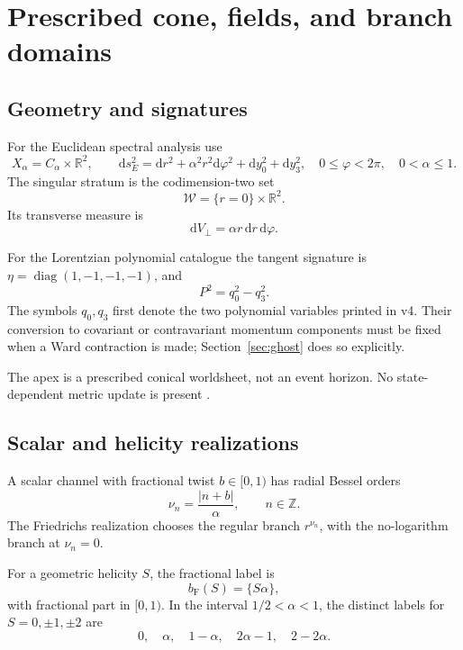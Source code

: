 \documentclass[11pt,a4paper]{article}
\newcommand{\RR}{\mathbb R}
\newcommand{\ZZ}{\mathbb Z}
\newcommand{\dd}{\mathrm d}
\newcommand{\WW}{\mathcal W}
\newcommand{\Fr}{\mathrm F}
\newcommand{\abs}[1]{\lvert #1\rvert}
\DeclareMathOperator{\diag}{diag}
\theoremstyle{plain}
\theoremstyle{definition}
\theoremstyle{remark}
\numberwithin{equation}{section}
\begin{document}
\section{Prescribed cone, fields, and branch domains}
\label{sec:conventions}

\subsection{Geometry and signatures}

For the Euclidean spectral analysis use
\begin{equation}
X_\alpha=C_\alpha\times\RR^2,\qquad
\dd s_E^2=\dd r^2+\alpha^2r^2\dd\varphi^2
 +\dd y_0^2+\dd y_3^2,
\quad
0\le\varphi<2\pi,
\quad 0<\alpha\le1.
\label{eq:geometry}
\end{equation}
The singular stratum is the codimension-two set
\[
\WW=\{r=0\}\times\RR^2.
\]
Its transverse measure is
\[
\dd V_\perp=\alpha r\,\dd r\,\dd\varphi.
\]

For the Lorentzian polynomial catalogue the tangent signature is
\(\eta=\diag(1,-1,-1,-1)\), and
\begin{equation}
P^2=q_0^2-q_3^2.
\label{eq:P2}
\end{equation}
The symbols \(q_0,q_3\) first denote the two polynomial variables
printed in v4. Their conversion to covariant or contravariant
momentum components must be fixed when a Ward contraction is made;
Section~\ref{sec:ghost} does so explicitly.

The apex is a prescribed conical worldsheet, not an event horizon.
No state-dependent metric update is present
\cite{CheungIB,CheungIBG}.

\subsection{Scalar and helicity realizations}

A scalar channel with fractional twist \(b\in[0,1)\) has radial
Bessel orders
\[
\nu_n=\frac{\abs{n+b}}{\alpha},\qquad n\in\ZZ.
\]
The Friedrichs realization chooses the regular branch
\(r^{\nu_n}\), with the no-logarithm branch at \(\nu_n=0\).

For a geometric helicity \(S\), the fractional label is
\begin{equation}
b_\Fr(S)=\{S\alpha\},
\label{eq:fractionallabel}
\end{equation}
with fractional part in \([0,1)\).
In the interval \(1/2<\alpha<1\), the distinct labels for
\(S=0,\pm1,\pm2\) are
\[
0,\quad \alpha,\quad 1-\alpha,\quad
2\alpha-1,\quad 2-2\alpha.
\]
\end{document}
